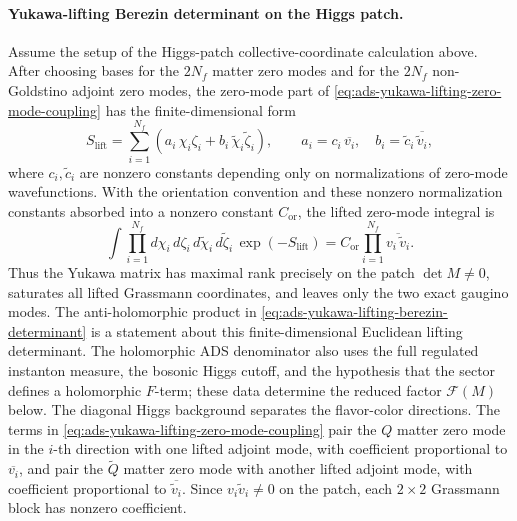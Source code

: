 \paragraph{Yukawa-lifting Berezin determinant on the Higgs patch.}
\label{par:ads-yukawa-lifting-berezin-determinant}
Assume the setup of the Higgs-patch collective-coordinate calculation above.
After choosing bases for the \(2N_f\) matter zero modes and for the \(2N_f\)
non-Goldstino adjoint zero modes, the zero-mode part of
\eqref{eq:ads-yukawa-lifting-zero-mode-coupling} has the finite-dimensional
form
\begin{equation}
  S_{\mathrm{lift}}
  =
  \sum_{i=1}^{N_f}
  \left(
    a_i\,\chi_i\zeta_i
    +
    b_i\,\widetilde\chi_i\widetilde\zeta_i
  \right),
  \qquad
  a_i=c_i\,\overline{v_i},\quad
  b_i=\widetilde c_i\,\overline{\widetilde v_i},
  \label{eq:ads-yukawa-lifting-diagonal-matrix}
\end{equation}
where \(c_i,\widetilde c_i\) are nonzero constants depending only on
normalizations of zero-mode wavefunctions.  With the orientation convention
and these nonzero normalization constants absorbed into a nonzero constant
\(C_{\mathrm{or}}\), the lifted zero-mode integral is
\begin{equation}
  \int
  \prod_{i=1}^{N_f}
  d\chi_i\,d\zeta_i\,d\widetilde\chi_i\,d\widetilde\zeta_i\,
  \exp(-S_{\mathrm{lift}})
  =
  C_{\mathrm{or}}
  \prod_{i=1}^{N_f}
  \overline{v_i\,\widetilde v_i}.
  \label{eq:ads-yukawa-lifting-berezin-determinant}
\end{equation}
Thus the Yukawa matrix has maximal rank precisely on the patch
\(\det M\neq0\), saturates all lifted Grassmann coordinates, and leaves only
the two exact gaugino modes.  The anti-holomorphic product in
\eqref{eq:ads-yukawa-lifting-berezin-determinant} is a statement about this
finite-dimensional Euclidean lifting determinant.  The holomorphic ADS
denominator also uses the full regulated instanton measure, the bosonic Higgs
cutoff, and the hypothesis that the sector defines a holomorphic \(F\)-term;
these data determine the reduced factor
\(\mathcal F(M)\) below.
The diagonal Higgs background separates the flavor-color directions.  The
terms in \eqref{eq:ads-yukawa-lifting-zero-mode-coupling} pair the \(Q\)
matter zero mode in the \(i\)-th direction with one lifted adjoint mode, with
coefficient proportional to \(\overline{v_i}\), and pair the
\(\widetilde Q\) matter zero mode with another lifted adjoint mode, with
coefficient proportional to \(\overline{\widetilde v_i}\).  Since
\(v_i\widetilde v_i\neq0\) on the patch, each \(2\times2\) Grassmann block
has nonzero coefficient.

